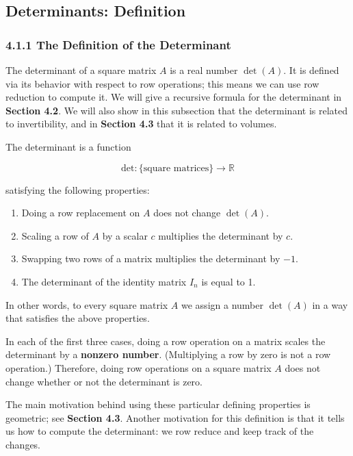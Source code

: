 \documentclass[a4paper,12pt]{article}
\begin{document}
\small

\small

\subsection{Determinants: Definition}
\subsubsection*{4.1.1 The Definition of the Determinant}

The determinant of a square matrix \( A \) is a real number \(\det(A)\). It is defined via its behavior with respect to row operations; this means we can use row reduction to compute it. We will give a recursive formula for the determinant in \textbf{Section 4.2}. We will also show in this subsection that the determinant is related to invertibility, and in \textbf{Section 4.3} that it is related to volumes.
\begin{tcolorbox}[title=Definition,colframe=blue!70!black, colback=blue!5!white]\label{def:4propertiesofdeterminant}
The determinant is a function

\[
\text{det}: \{\text{square matrices}\} \to \mathbb{R}
\]

satisfying the following properties:

\begin{enumerate}
    \item Doing a row replacement on \( A \) does not change \(\det(A)\).
    \item Scaling a row of \( A \) by a scalar \( c \) multiplies the determinant by \( c \).
    \item Swapping two rows of a matrix multiplies the determinant by \(-1\).
    \item The determinant of the identity matrix \( I_n \) is equal to 1.
\end{enumerate}
\end{tcolorbox}
In other words, to every square matrix \( A \) we assign a number \(\det(A)\) in a way that satisfies the above properties.

In each of the first three cases, doing a row operation on a matrix scales the determinant by a \textbf{nonzero number}. (Multiplying a row by zero is not a row operation.) Therefore, doing row operations on a square matrix \( A \) does not change whether or not the determinant is zero.

The main motivation behind using these particular defining properties is geometric; see \textbf{Section 4.3}. Another motivation for this definition is that it tells us how to compute the determinant: we row reduce and keep track of the changes.
\end{document}
